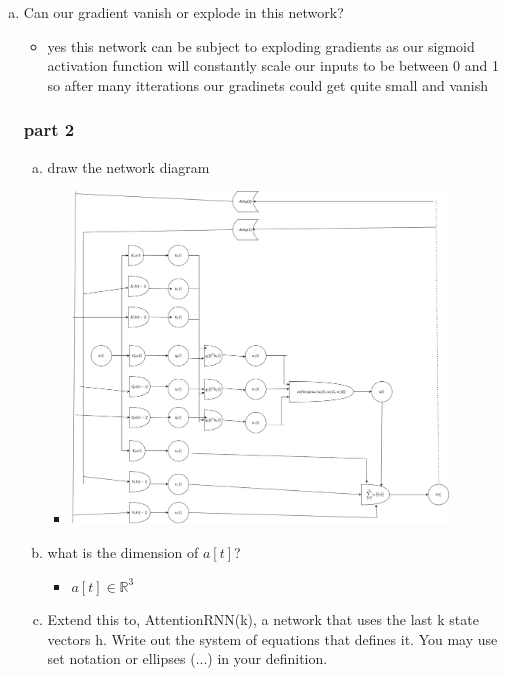 \documentclass{article}
\begin{document}
\begin{enumerate}[(a)]
\begin{itemize}
    \end{itemize}
    \item Can our gradient vanish or explode in this network?
    \begin{itemize}
        \color{blue}
        \item yes this network can be subject to exploding gradients as our sigmoid activation function will constantly scale our inputs to be between 0 and 1 so after many itterations our gradinets could get quite small and vanish 
    \end{itemize}
    \subsubsection{part 2}
    \begin{enumerate} [(a)]
        \item draw the network diagram
        \begin{itemize}
            \color{blue}
            \item \includegraphics*[width=10cm]{./assigment_screenshots/rnn_2.png}
        \end{itemize}
        \item what is the dimension of $a[t]$?
        \begin{itemize}
            \color{blue}
            \item $a[t]\in \mathbb{R}^{3}$
        \end{itemize}
        \item Extend this to, AttentionRNN(k), a network that uses the last k
        state vectors h. Write out the system of equations that defines it. You may
        use set notation or ellipses (...) in your definition.
        \begin{itemize}

\end{itemize}
\end{enumerate}
\end{enumerate}
\end{document}
